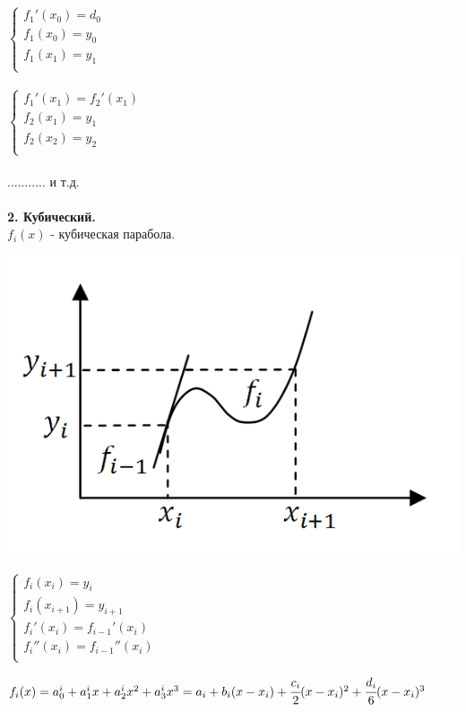 \documentclass[12pt]{article}
\theoremstyle{definition}
\numberwithin{equation}{section}
\begin{document}
	$  
	\left\{  
	\begin{array}{lcl}  
	f_1'(x_0) = d_0 \\  
	f_1(x_0) = y_0\\
	f_1(x_1) = y_1\\
	\end{array}   
	\right.  
	$
	\\ \\
	$  
	\left\{  
	\begin{array}{lcl}  
	f_1'(x_1) = f_2'(x_1) \\  
	f_2(x_1) = y_1\\
	f_2(x_2) = y_2\\
	\end{array}   
	\right.  
	$\\ \\
	........... и т.д.\\
	\\
	\noindent \textbf{2. Кубический.}\\
	$f_i(x)$ - кубическая парабола.\begin{center}
		\includegraphics[scale=0.6]{l3_5.png}\end{center}
	$  
	\left\{  
	\begin{array}{lcl}  
	f_i(x_i) = y_i \\  
	f_i(x_{i+1}) = y_{i+1}\\
	f_i'(x_i) = f_{i-1}'(x_i)\\
	f_i''(x_i) = f_{i-1}''(x_i)\\
	\end{array}   
	\right.  
	$
	\begin{center}
		$f_i(x) = a_0^i+a_1^ix+a_2^ix^2+a_3^ix^3 = a_i+b_i(x-x_i)+ \cfrac{c_i}{2}(x-x_i)^2+ \cfrac{d_i}{6}(x-x_i)^3$
	\end{center}
\end{document}
